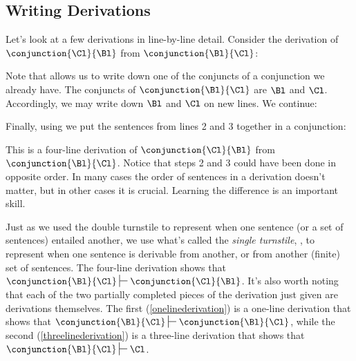 \subsection{Writing Derivations}

Let's look at a few derivations in line-by-line detail.
Consider the derivation of $\conjunction{\Cl}{\Bl}$ from $\conjunction{\Bl}{\Cl}$:
\begin{gproof}[\label{onelinederivation}]
\end{gproof}
\noindent{}Note that  allows us to write down one of the conjuncts of a conjunction we already have. 
The conjuncts of $\conjunction{\Bl}{\Cl}$ are $\Bl$ and $\Cl$. 
Accordingly, we may write down $\Bl$ and $\Cl$ on new lines. 
We continue:
\begin{gproof}[\label{threelinederivation}]
\end{gproof}
\noindent{}Finally, using  we put the sentences from lines 2 and 3 together in a conjunction:
\begin{gproof}[\label{simpleconjunction}]
\end{gproof}
\noindent{}This is a four-line derivation of $\conjunction{\Cl}{\Bl}$ from $\conjunction{\Bl}{\Cl}$.
Notice that steps 2 and 3 could have been done in opposite order.
In many cases the order of sentences in a derivation doesn't matter, but in other cases it is crucial.
Learning the difference is an important skill.

Just as we used the double turnstile to represent when one sentence (or a set of sentences) entailed another, we use what's called the \emph{single turnstile}, \mention{\:$\sststile{}{}\:$}, to represent when one sentence is derivable from another, or from another (finite) set of sentences. 
The four-line derivation shows that $\conjunction{\Bl}{\Cl}\sststile{}{}\conjunction{\Cl}{\Bl}$. 
It's also worth noting that each of the two partially completed pieces of the derivation just given are derivations themselves. 
The first (\ref{onelinederivation}) is a one-line derivation that shows that $\conjunction{\Bl}{\Cl}\sststile{}{}\conjunction{\Bl}{\Cl}$, while the second (\ref{threelinederivation}) is a three-line derivation that shows that $\conjunction{\Bl}{\Cl}\sststile{}{}\Cl$.


